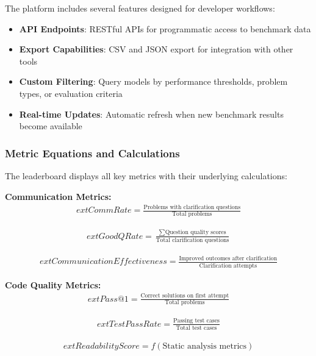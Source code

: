 \documentclass[conference]{IEEEtran}
\begin{document}
The platform includes several features designed for developer workflows:

\begin{itemize}
    \item \textbf{API Endpoints}: RESTful APIs for programmatic access to benchmark data
    \item \textbf{Export Capabilities}: CSV and JSON export for integration with other tools
    \item \textbf{Custom Filtering}: Query models by performance thresholds, problem types, or evaluation criteria
    \item \textbf{Real-time Updates}: Automatic refresh when new benchmark results become available
\end{itemize}

\subsubsection{Metric Equations and Calculations}

The leaderboard displays all key metrics with their underlying calculations:

\textbf{Communication Metrics:}
\begin{align}
	ext{Comm Rate} = \frac{\text{Problems with clarification questions}}{\text{Total problems}}
\end{align}

\begin{align}
	ext{Good Q Rate} = \frac{\sum \text{Question quality scores}}{\text{Total clarification questions}}
\end{align}

\begin{align}
	ext{Communication Effectiveness} = \frac{\text{Improved outcomes after clarification}}{\text{Clarification attempts}}
\end{align}

\textbf{Code Quality Metrics:}
\begin{align}
	ext{Pass@1} = \frac{\text{Correct solutions on first attempt}}{\text{Total problems}}
\end{align}

\begin{align}
	ext{Test Pass Rate} = \frac{\text{Passing test cases}}{\text{Total test cases}}
\end{align}

\begin{align}
	ext{Readability Score} = f(\text{Static analysis metrics})
\end{align}
\end{document}

